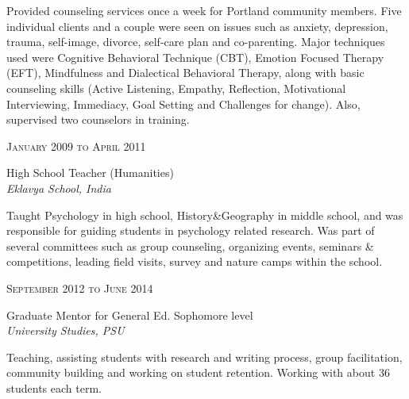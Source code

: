 \documentclass[10pt]{article} %
\begin{document}
{\begin{minipage}[t]{0.5\textwidth}
\normalsize{
Provided counseling services once a week 
for Portland community members. Five individual clients and a couple were seen on issues such as anxiety, depression, trauma, self-image, divorce, self-care plan and co-parenting. Major techniques used were Cognitive Behavioral Technique (CBT), Emotion Focused Therapy (EFT), Mindfulness and Dialectical Behavioral Therapy, along with basic counseling skills (Active Listening, Empathy, Reflection, Motivational Interviewing, Immediacy, Goal Setting and Challenges for change). 
Also, supervised two counselors in training.
}\\

{\raggedleft\textsc{January 2009 to April 2011}\par}

{\raggedright\large High School Teacher (Humanities)\\
\textit{Eklavya School, India}\\[5pt]}

\normalsize{
Taught Psychology in high school, History\&Geography in middle school, and was responsible for guiding students in psychology related research. Was part of several committees such
as group counseling, organizing events, seminars \& competitions, leading field visits, survey and nature camps within the school.
}\\


{\raggedleft\textsc{September 2012 to June 2014}\par}

{\raggedright\large Graduate Mentor for General Ed. Sophomore level \\
\textit{University Studies, PSU}\\[5pt]}

\normalsize{
Teaching, assisting students with research and writing process, group facilitation, community building and working on student retention. Working with about 36 students each term.
}\\




\end{minipage}}
\end{document}
